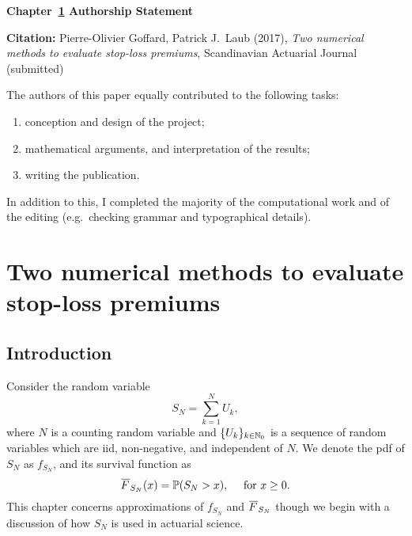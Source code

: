 \vspace*{\fill}

{\large \bf Chapter~\ref{chp:slp_ortho} Authorship Statement}

\vspace{1em}

{\bf Citation:} Pierre-Olivier Goffard, Patrick J.\ Laub (2017), \emph{Two numerical methods to evaluate stop-loss premiums}, Scandinavian Actuarial Journal (submitted)

\vspace{1em}

The authors of this paper equally contributed to the following tasks:
\begin{enumerate}
\item conception and design of the project;
\item mathematical arguments, and interpretation of the results;
\item writing the publication.
\end{enumerate}

In addition to this, I completed the majority of the computational work and of the editing (e.g.\ checking grammar and typographical details).

\vspace{3em}

\vspace*{\fill}

\chapter{Two numerical methods to evaluate stop-loss premiums} \label{chp:slp_ortho}
\section{Introduction}\label{sec:Introduction}

Consider the random variable
\begin{equation*}\label{eq:AggregatedClaimAmountsRV}
S_N=\sum_{k=1}^{N}U_{k},
\end{equation*}
where $N$ is a counting random variable and $\{U_{k}\}_{k\in\mathbb{N}_0}$ is a sequence of random variables which are iid, non-negative, and independent of $N$.
We denote the pdf of $S_N$ as $f_{S_N}$, and its survival function as
\begin{equation*}\label{eq:DefinitionSurvivalFunction}
\Ftail_{S_N}(x)= \Prob(S_N>x),\quad \text{ for } x\geq0.
\end{equation*}
This chapter concerns approximations of $f_{S_N}$ and $\Ftail_{S_N}$ though we begin with a discussion of how $S_N$ is used in actuarial science.

